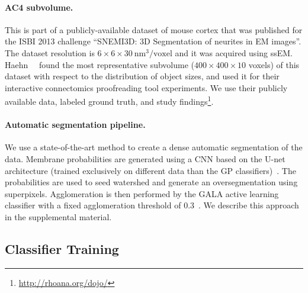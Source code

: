 \paragraph{AC4 subvolume.} This is part of a publicly-available dataset of mouse cortex that was published for the ISBI 2013 challenge ``SNEMI3D: 3D Segmentation of neurites in EM images''. The dataset resolution is $6\times6\times30~\text{nm}^3\text{/voxel}$ and it was acquired using ssEM. Haehn~\etal~\cite{haehn_dojo_2014} found the most representative subvolume ($400\times400\times10$ voxels) of this dataset with respect to the distribution of object sizes, and used it for their interactive connectomics proofreading tool experiments. We use their publicly available data, labeled ground truth, and study findings\footnote{\scriptsize{\url{http://rhoana.org/dojo/}}}.


\paragraph{Automatic segmentation pipeline.}
We use a state-of-the-art method to create a dense automatic segmentation of the data. Membrane probabilities are generated using a CNN based on the U-net architecture (trained exclusively on different data than the GP classifiers)~\cite{RonnebergerFB15}. The probabilities are used to seed watershed and generate an oversegmentation using superpixels. Agglomeration is then performed by the GALA active learning classifier with a fixed agglomeration threshold of 0.3~\cite{GALA2014}. We describe this approach in the supplemental material.

\subsection{Classifier Training}

